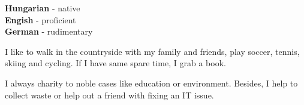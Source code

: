 \documentclass[9pt]{developercv} %
\begin{document}
\begin{minipage}[t]{0.3\textwidth}
	\vspace{-\baselineskip} %

	
	\textbf{Hungarian} - native\\
	\textbf{Engish} - proficient\\
	\textbf{German} - rudimentary
\end{minipage}
\hfill
\begin{minipage}[t]{0.3\textwidth}
	\vspace{-\baselineskip} %
	
	
	I like to walk in the countryside with my family and friends, play soccer, tennis, skiing and cycling. If I have same spare time, I grab a book.
\end{minipage}
\hfill
\begin{minipage}[t]{0.3\textwidth}
	\vspace{-\baselineskip} %
	
	
	I always charity to noble cases like education or environment. Besides, I help to collect waste or help out a friend with fixing an IT issue.
\end{minipage}

\end{document}
